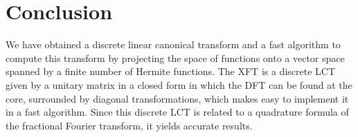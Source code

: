 \documentclass[12pt]{article}
\begin{document}
\section{Conclusion}\label{seccuatro}
We have obtained a discrete linear canonical transform and a fast algorithm to compute this transform by projecting the space of functions onto a vector space spanned by a finite number of Hermite functions. The XFT is a discrete LCT given by a unitary matrix in a closed form in which the DFT can be found at the core, surrounded by diagonal transformations, which makes easy to implement it in a fast algorithm. Since this discrete LCT is related to a  quadrature formula of the fractional Fourier transform, it yields accurate results.

\end{document}
